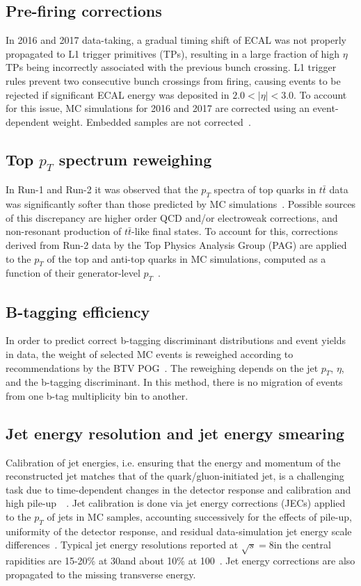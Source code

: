 \subsection{Pre-firing corrections}
In 2016 and 2017 data-taking, a gradual timing shift of ECAL was not properly propagated to L1 trigger primitives (TPs), resulting in a large fraction of high $\eta$ TPs being incorrectly associated with the previous bunch crossing. L1 trigger rules prevent two consecutive bunch crossings from firing, causing events to be rejected if significant ECAL energy was deposited in $2.0 < |\eta| < 3.0$. To account for this issue, MC simulations for 2016 and 2017 are corrected using an event-dependent weight. Embedded samples are not corrected~\cite{CMS-HIG-19-010}.

\subsection{Top \texorpdfstring{$p_{T}$}{pT} spectrum reweighing}
In Run-1 and Run-2 it was observed that the $p_{T}$ spectra of top quarks in $t\bar{t}$ data was significantly softer than those predicted by MC simulations~\cite{twiki_Top_pt_reweighing}. Possible sources of this discrepancy are higher order QCD and/or electroweak corrections, and non-resonant production of $t\bar{t}$-like final states. To account for this, corrections derived from Run-2 data by the Top Physics Analysis Group (PAG) are applied to the $p_{T}$ of the top and anti-top quarks in MC simulations, computed as a function of their generator-level $p_{T}$~\cite{twiki_Top_pt_reweighing}.

\subsection{B-tagging efficiency}
In order to predict correct b-tagging discriminant distributions and event yields in data, the weight of selected MC events is reweighed according to recommendations by the BTV POG~\cite{twiki_btag_SF_methods}. The reweighing depends on the jet $p_{T}$, $\eta$, and the b-tagging discriminant. In this method, there is no migration of events from one b-tag multiplicity bin to another.

\subsection{Jet energy resolution and jet energy smearing}
Calibration of jet energies, i.e. ensuring that the energy and momentum of the reconstructed jet matches that of the quark/gluon-initiated jet, is a challenging task due to time-dependent changes in the detector response and calibration and high pile-up~\cite{CMS-JME-13-004}~\cite{proceedings-Agarwal:2022txa}. Jet calibration is done via jet energy corrections (JECs) applied to the $p_{T}$ of jets in MC samples, accounting successively for the effects of pile-up, uniformity of the detector response, and residual data-simulation jet energy scale differences~\cite{twiki_JetResolution_JEC}. Typical jet energy resolutions reported at $\sqrt{s} = 8$\TeV in the central rapidities are 15-20\% at 30\GeV and about 10\% at 100\GeV~\cite{CMS-JME-13-004}. Jet energy corrections are also propagated to the missing transverse energy.

